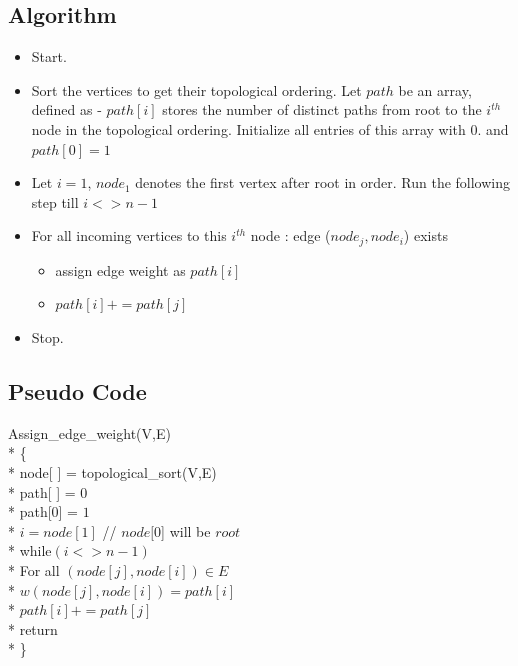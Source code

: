 \documentclass{article}
\begin{document}
\subsection{Algorithm}
\begin{itemize}
\item Start.
\item Sort the vertices to get their topological ordering. Let $path$ be an array, defined as - $path[i]$ stores the number of distinct paths from root to the $i^{th}$ node in the topological ordering. Initialize all entries of this array with $0$. and $path[0] = 1$
\item Let $i=1$, $node_1$ denotes the first vertex after root in order. Run the following step till $i <> n-1$
\item For all incoming vertices to this $i^{th}$ node : edge ($node_j, node_i$) exists
\begin{itemize}
\item assign edge weight as $path[i]$
\item $path[i] += path[j]$
\end{itemize} 
\item Stop.
\end{itemize}
\subsection{Pseudo Code}
Assign\_edge\_weight(V,E)	\\*
\{			\\*
	\hspace*{1cm}node[ ] = topological\_sort(V,E) \\*
	\hspace*{1cm}path[ ] = $0$ \\*
	\hspace*{1cm}path[0] = $1$ \\*
	\hspace*{1cm} $i = node[1]$ // $node[0$] will be $root$\\*
	\hspace*{1cm} while$(i <> n-1)$  \\*
	\hspace*{2cm} For all $(node[j], node[i]) \in E$ \\*
	\hspace*{3cm} $w(node[j], node[i]) = path[i]$ \\*
	\hspace*{3cm} $path[i] += path[j]$ \\*
	\hspace*{1cm}return \\*
\}
\end{document}
